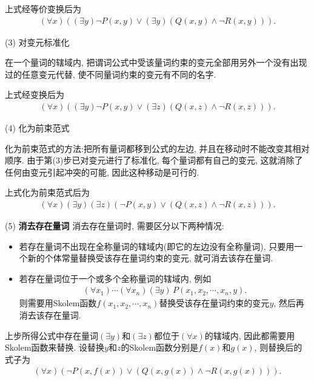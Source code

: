 上式经等价变换后为
\begin{align}
  (\forall x)((\exists  y)\neg P(x, y)\vee (\exists  y)(Q(x, y) \wedge \neg R(x, y))).
\end{align}

(3) 对变元标准化

在一个量词的辖域内, 把谓词公式中受该量词约束的变元全部用另外一个没有出现过的任意变元代替, 使不同量词约束的变元有不同的名字.
\begin{example}
上式经变换后为
\begin{align}
  (\forall x)((\exists  y)\neg P(x, y)\vee (\exists  z)( Q(x, z) \wedge \neg R(x, z))).
\end{align}
\end{example}

(4) 化为前束范式

化为前束范式的方法:把所有量词都移到公式的左边, 并且在移动时不能改变其相对顺序. 由于第(3)步已对变元进行了标准化, 每个量词都有自己的变元, 这就消除了任何由变元引起冲突的可能, 因此这种移动是可行的.

\begin{example}
上式化为前束范式后为
\begin{align}
  (\forall x)(\exists  y) (\exists  z)(\neg P(x, y)\vee ( Q(x, z) \wedge \neg R(x, z))).
\end{align}
\end{example}

(5) \textbf{消去存在量词}  消去存在量词时, 需要区分以下两种情况:
\begin{itemize}
\item 若存在量词不出现在全称量词的辖域内(即它的左边没有全称量词), 只要用一个新的个体常量替换受该存在量词约束的变元, 就可消去该存在量词.

\item 若存在量词位于一个或多个全称量词的辖域内, 例如
\begin{align}
  (\forall x_1)\cdots(\forall x_n) (\exists  y)\,P(x_1, x_2 ,\cdots, x_n ,y).
\end{align}
则需要用Skolem函数$f(x_1,x_2,\cdots, x_n)$替换受该存在量词约束的变元$y$, 然后再消去该存在量词.
\end{itemize}
\begin{example}
上步所得公式中存在量词$(\exists  y)$和$(\exists  z)$都位于$(\forall x)$的辖域内, 因此都需要用Skolem函数来替换. 设替换$y$和$z$的Skolem函数分别是$f(x)$和$g(x)$, 则替换后的式子为
\begin{align}
  (\forall x)(\neg P(x,f(x))\vee (Q(x,g(x))\wedge \neg R(x,g(x)))).
\end{align}
\end{example}

